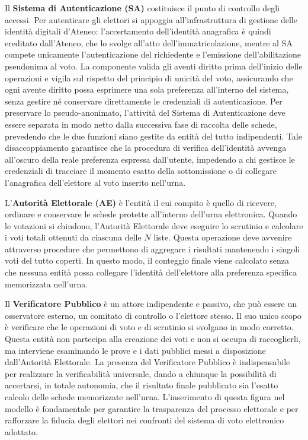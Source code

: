 Il \textbf{Sistema di Autenticazione (SA)} costituisce il punto di controllo degli accessi. Per autenticare gli elettori si appoggia all'infrastruttura di gestione delle identità digitali d'Ateneo: l'accertamento dell'identità anagrafica è quindi ereditato dall'Ateneo, che lo svolge all'atto dell'immatricolazione, mentre al SA compete unicamente l'autenticazione del richiedente e l'emissione dell'abilitazione pseudonima al voto. La componente valida gli aventi diritto prima dell'inizio delle operazioni e vigila sul rispetto del principio di unicità del voto, assicurando che ogni avente diritto possa esprimere una sola preferenza all'interno del sistema, senza gestire né conservare direttamente le credenziali di autenticazione. Per preservare lo pseudo-anonimato, l'attività del Sistema di Autenticazione deve essere separata in modo netto dalla successiva fase di raccolta delle schede, prevedendo che le due funzioni siano gestite da entità del tutto indipendenti. Tale disaccoppiamento garantisce che la procedura di verifica dell'identità avvenga all'oscuro della reale preferenza espressa dall'utente, impedendo a chi gestisce le credenziali di tracciare il momento esatto della sottomissione o di collegare l'anagrafica dell'elettore al voto inserito nell'urna.

L'\textbf{Autorità Elettorale (AE)} è l'entità il cui compito è quello di ricevere, ordinare e conservare le schede protette all'interno dell'urna elettronica. Quando le votazioni si chiudono, l'Autorità Elettorale deve eseguire lo scrutinio e calcolare i voti totali ottenuti da ciascuna delle $N$ liste. Questa operazione deve avvenire attraverso procedure che permettono di aggregare i risultati mantenendo i singoli voti del tutto coperti. In questo modo, il conteggio finale viene calcolato senza che nessuna entità possa collegare l'identità dell'elettore alla preferenza specifica memorizzata nell'urna.

Il \textbf{Verificatore Pubblico} è un attore indipendente e passivo, che può essere un osservatore esterno, un comitato di controllo o l'elettore stesso. Il suo unico scopo è verificare che le operazioni di voto e di scrutinio si svolgano in modo corretto. Questa entità non partecipa alla creazione dei voti e non si occupa di raccoglierli, ma interviene esaminando le prove e i dati pubblici messi a disposizione dall'Autorità Elettorale. La presenza del Verificatore Pubblico è indispensabile per realizzare la verificabilità universale, dando a chiunque la possibilità di accertarsi, in totale autonomia, che il risultato finale pubblicato sia l'esatto calcolo delle schede memorizzate nell'urna. L'inserimento di questa figura nel modello è fondamentale per garantire la trasparenza del processo elettorale e per rafforzare la fiducia degli elettori nei confronti del sistema di voto elettronico adottato.

